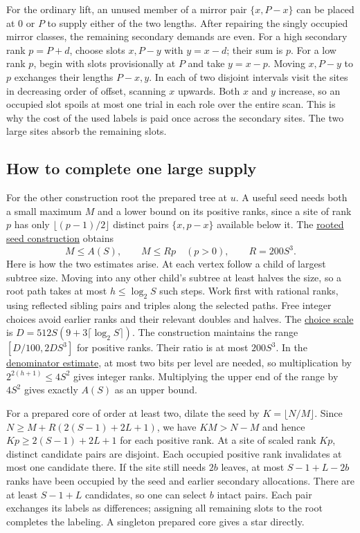 \documentclass[11pt]{article}
\newcommand{\proofmodule}[2]{\href{https://github.com/Aky-lab/graceful-leaf-threshold-preprint/blob/v1.2/lean/Next/#1.lean}{#2}}
\begin{document}
For the ordinary lift, an unused member of a mirror pair
$\{x,P-x\}$ can be placed at $0$ or $P$ to supply either of the
two lengths. After repairing the singly occupied mirror classes,
the remaining secondary demands are even. For a high secondary rank
$p=P+d$, choose slots $x,P-y$ with $y=x-d$; their sum is $p$.
For a low rank $p$, begin with slots provisionally at $P$ and take
$y=x-p$. Moving $x,P-y$ to $p$ exchanges their lengths $P-x,y$.
In each of two disjoint intervals visit the sites in decreasing order
of offset, scanning $x$ upwards. Both $x$ and $y$ increase, so an
occupied slot spoils at most one trial in each role over the entire
scan. This is why the cost of the used labels is paid once across the
secondary sites. The two large sites absorb the remaining slots.

\subsection{How to complete one large supply}
For the other construction root the prepared tree at $u$. A useful
seed needs both a small maximum $M$ and a lower bound on its positive
ranks, since a site of rank $p$ has only $\lfloor(p-1)/2\rfloor$
distinct pairs $\{x,p-x\}$ available below it. The
\proofmodule{SparseHeavySeed}{rooted seed construction} obtains
\[
 M\le A(S),\qquad M\le R p\quad(p>0),\qquad R=200S^3 .
\]
Here is how the two estimates arise. At each vertex follow a child of
largest subtree size. Moving into any other child's subtree at least
halves the size, so a root path takes at most $h\le\log_2 S$ such
steps. Work first with rational ranks, using reflected sibling pairs
and triples along the selected paths. Free integer choices avoid
earlier ranks and their relevant doubles and halves. The
\proofmodule{SparseChoiceScale}{choice scale} is
$D=512S(9+3\lceil\log_2 S\rceil)$. The construction maintains the
range $[D/100,2DS^3]$ for positive ranks. Their ratio is at most
$200S^3$. In the \proofmodule{SparseHeavySeed}{denominator estimate},
at most two bits per level are needed, so multiplication by
$2^{2(h+1)}\le4S^2$ gives integer ranks. Multiplying the upper end
of the range by $4S^2$ gives exactly $A(S)$ as an upper bound.

For a prepared core of order at least two, dilate the seed by
$K=\lfloor N/M\rfloor$. Since $N\ge M+R(2(S-1)+2L+1)$, we have
$KM>N-M$ and hence $Kp\ge2(S-1)+2L+1$ for each positive rank.
At a site of scaled rank $Kp$, distinct candidate pairs are disjoint.
Each occupied positive rank invalidates at most one candidate there.
If the site still needs $2b$ leaves, at most $S-1+L-2b$ ranks have
been occupied by the seed and earlier secondary allocations. There
are at least $S-1+L$ candidates, so one can select $b$ intact pairs.
Each pair exchanges its labels as differences; assigning all remaining
slots to the root completes the labeling. A singleton prepared core
gives a star directly.
\end{document}

